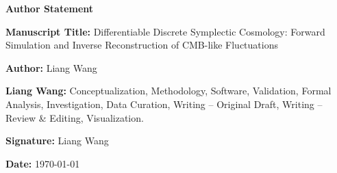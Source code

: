 \documentclass[11pt]{article}
\begin{document}
\begin{center}
\Large\textbf{Author Statement}
\end{center}

\vspace{1cm}

\noindent\textbf{Manuscript Title:} Differentiable Discrete Symplectic Cosmology: Forward Simulation and Inverse Reconstruction of CMB-like Fluctuations

\vspace{0.5cm}

\noindent\textbf{Author:} Liang Wang

\vspace{1cm}

\noindent\textbf{Liang Wang:} Conceptualization, Methodology, Software, Validation, Formal Analysis, Investigation, Data Curation, Writing -- Original Draft, Writing -- Review \& Editing, Visualization.

\vspace{2cm}

\noindent\textbf{Signature:} Liang Wang

\noindent\textbf{Date:} \today
\end{document}
